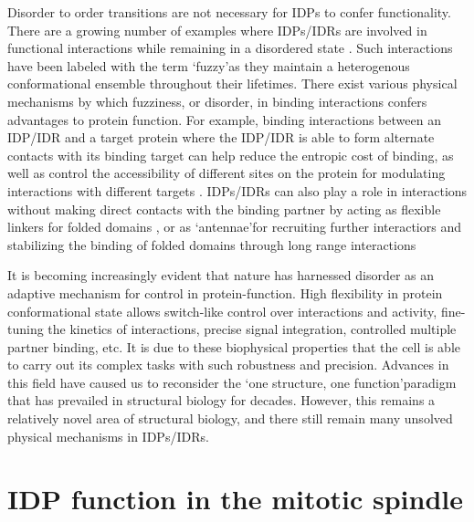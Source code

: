 \par Disorder to order transitions are not necessary for IDPs to confer functionality. There are a growing number of examples where IDPs/IDRs are involved in functional interactions while remaining in a disordered state \cite{tompa2008fuzzy}. Such interactions have been labeled with the term \lq fuzzy\rq as they maintain a heterogenous conformational ensemble throughout their lifetimes. There exist various physical mechanisms by which fuzziness, or disorder, in binding interactions confers advantages to protein function. For example, binding interactions between an IDP/IDR and a target protein where the IDP/IDR is able to form alternate contacts with its binding target can help reduce the entropic cost of binding, as well as control the accessibility of different sites on the protein for modulating interactions with different targets \cite{graham2001tcf4, fontes2000structural}. IDPs/IDRs can also play a role in interactions without making direct contacts with the binding partner by acting as flexible linkers for folded domains \cite{bhattacharyya2006ste5}, or as \lq antennae\rq for \cite{sigalov2004homooligomerization} recruiting further interactiors and stabilizing the binding of folded domains through long range interactions \cite{zor2002roles, yu1994structural} 

It is becoming increasingly evident that nature has harnessed disorder as an adaptive mechanism for control in protein-function. High flexibility in protein conformational state allows switch-like control over interactions and activity, fine-tuning the kinetics of interactions, precise signal integration, controlled multiple partner binding, etc.  It is due to these biophysical properties that the cell is able to carry out its complex tasks with such robustness and precision. Advances in this field have caused us to reconsider the  \lq one structure, one function\rq paradigm that has prevailed in structural biology for decades. However, this remains a relatively novel area of structural biology, and there still remain many unsolved physical mechanisms in IDPs/IDRs.

\section{IDP function in the mitotic spindle}
 
